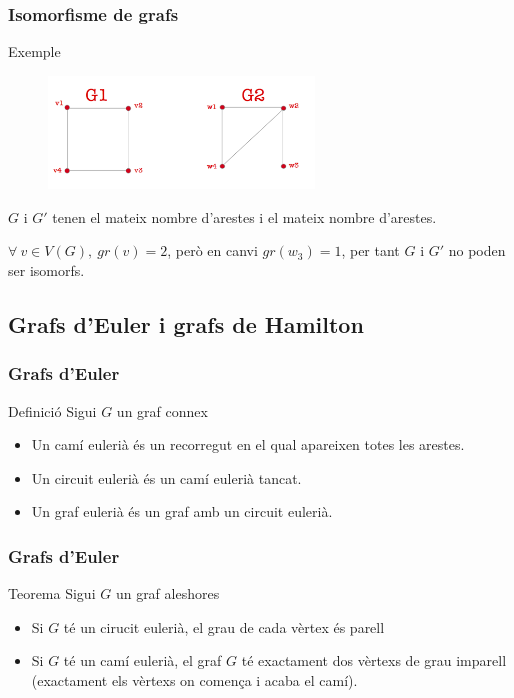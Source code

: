\documentclass{beamer}
\begin{document}
\begin{frame}
\frametitle{Isomorfisme de grafs}
\begin{block}{Exemple}
\begin{figure}[h]
 \label{fig:volum}
\centering
\includegraphics[height=3cm]{g9}
\end{figure}
$G$ i $G'$ tenen el mateix nombre d'arestes i el mateix nombre d'arestes.

$\forall \ v\in V(G),\ gr(v) = 2$, però en canvi $gr(w_3) = 1$, per tant $G$ i $G'$ no poden ser isomorfs. 
\end{block}
\end{frame}





\subsection{Grafs d'Euler i grafs de Hamilton}

\begin{frame}
\frametitle{Grafs d'Euler}
\begin{block}{Definició}
Sigui $G$ un graf connex
\begin{itemize}
\item Un camí eulerià és un recorregut en el qual apareixen totes les arestes. 
\item Un circuit eulerià és un camí eulerià tancat.
\item Un graf eulerià és un graf amb un circuit eulerià.
\end{itemize}
\end{block}
\end{frame}


\begin{frame}
\frametitle{Grafs d'Euler}
\begin{block}{Teorema}
Sigui $G$ un graf aleshores
\begin{itemize}
\item Si $G$ té un cirucit eulerià, el grau de cada vèrtex és  parell
\item Si $G$ té un camí eulerià, el graf $G$ té exactament dos vèrtexs de grau imparell (exactament els vèrtexs on comença i acaba el camí).
\end{itemize}
\end{block}
\end{frame}
\end{document}
